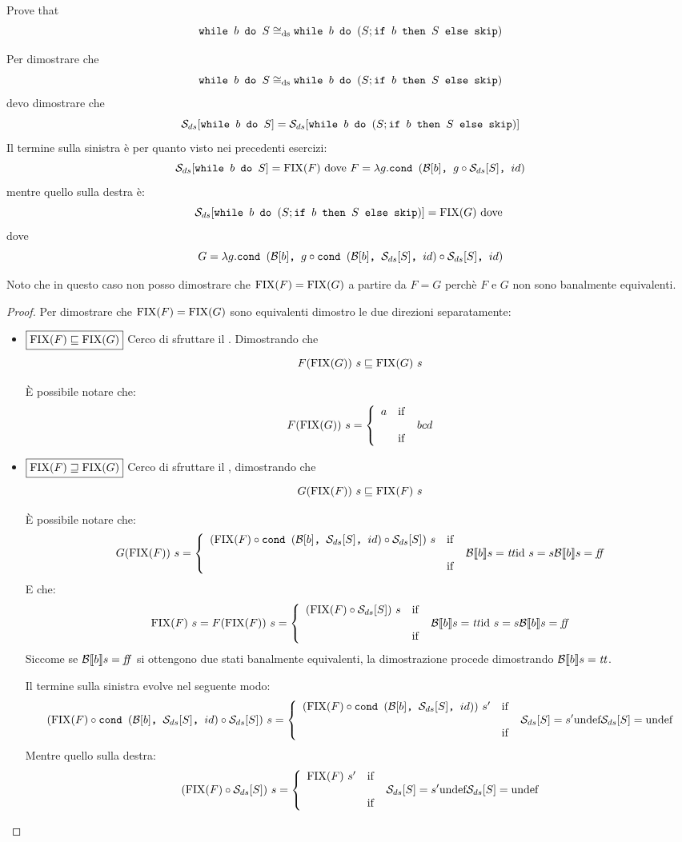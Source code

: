 {Prove that
$$
	\wbS{b}{S} \eqDS \wbS{b}{(S; \ifABC{b}{S}{\skipForFriends})}
$$
}
{
Per dimostrare che 
$$
	\wbS{b}{S} \eqDS \wbS{b}{(S; \ifABC{b}{S}{\skipForFriends})}
$$	
devo dimostrare che
$$
\dsCtxt{\wbS{b}{S}} = \dsCtxt{\wbS{b}{(S; \ifABC{b}{S}{\skipForFriends})}}
$$
Il termine sulla sinistra è per quanto visto nei precedenti esercizi:
$$
\dsCtxt{\wbS{b}{S}} = \fixp{F} \text{ dove } F = \lambda g. \cond{b}{g \circ \dsCtxt{S}}{id}
$$
mentre quello sulla destra è:
$$
\dsCtxt{\wbS{b}{(S; \ifABC{b}{S}{\skipForFriends})}} = \fixp{G} \text{ dove } 
$$
dove 
$$
G = \lambda g. \cond{b}{g \circ \cond{b}{\dsCtxt{S}}{id} \circ \dsCtxt{S}}{id} 
$$

Noto che in questo caso non posso dimostrare che $\fixp{F} = \fixp{G}$ a partire da $F = G$ perchè
$F$ e $G$ non sono banalmente equivalenti.

\begin{proof}
Per dimostrare che $\fixp{F} = \fixp{G}$ sono equivalenti dimostro le due direzioni separatamente:
\begin{itemize}
  \item $\boxed{\fixp{F} \sqsubseteq \fixp{G}}$
  Cerco di sfruttare il \FPIL. Dimostrando che
  $$
  F(\fixp{G})\ s \sqsubseteq \fixp{G}\ s
  $$

  È possibile notare che:
  $$
  F(\fixp{G})\ s =
    \caseFun{a}
            {b}
            {c}
            {d}
  $$
  \item $\boxed{\fixp{F} \sqsupseteq \fixp{G}}$
  Cerco di sfruttare il \FPIL, dimostrando che
  $$
  G(\fixp{F})\ s \sqsubseteq \fixp{F}\ s
  $$

  È possibile notare che:
  $$
  G(\fixp{F})\ s =
    \caseFun{(\fixp{F} \circ
                 \cond{b}{\dsCtxt{S}}{id} \circ \dsCtxt{S})\ s}
            {\B{b} = \semtrue}
            {\idDS\ s = s}
            {\B{b} = \semfalse}
  $$
  E che:
  $$
  \fixp{F}\ s = F(\fixp{F})\ s =
    \caseFun{(\fixp{F} \circ \dsCtxt{S})\ s}
            {\B{b} = \semtrue}
            {\idDS\ s = s}
            {\B{b} = \semfalse}
  $$
  Siccome se $\B{b} = \semfalse$ si ottengono due stati banalmente equivalenti,
  la dimostrazione procede dimostrando $\B{b} = \semtrue$.

  Il termine sulla sinistra evolve nel seguente modo:
  $$
  (\fixp{F} \circ \cond{b}{\dsCtxt{S}}{id} \circ \dsCtxt{S})\ s =
    \caseFun{(\fixp{F} \circ
                 \cond{b}{\dsCtxt{S}}{id})\ s'}
            {\dsCtxt{S} = s'}
            {\undefDS}
            {\dsCtxt{S} = \undefDS}
  $$
  Mentre quello sulla destra:
  $$
  (\fixp{F} \circ \dsCtxt{S})\ s =
    \caseFun{\fixp{F}\ s'}
            {\dsCtxt{S} = s'}
            {\undefDS}
            {\dsCtxt{S} = \undefDS}
  $$


\end{itemize}
\end{proof}}
